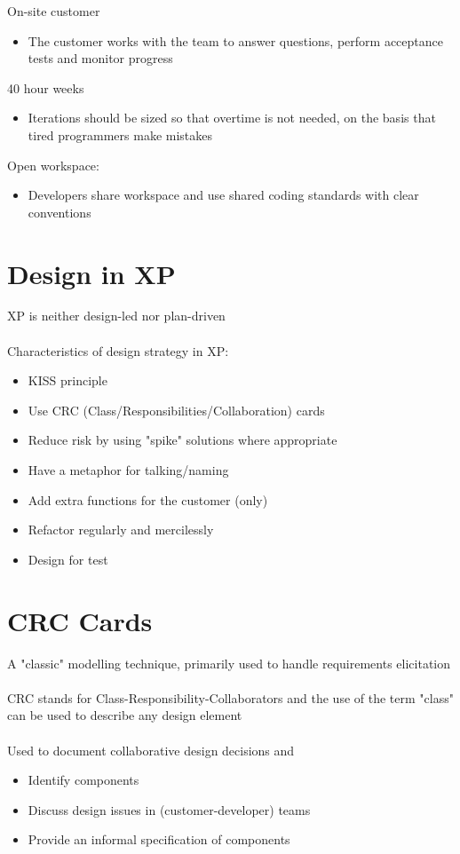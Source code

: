 \documentclass{article}[18pt]
\begin{document}
On-site customer
\begin{itemize}
	\item The customer works with the team to answer questions, perform acceptance tests and monitor progress
\end{itemize}
40 hour weeks
\begin{itemize}
	\item Iterations should be sized so that overtime is not needed, on the basis that tired programmers make mistakes
\end{itemize}
Open workspace:
\begin{itemize}
	\item Developers share workspace and use shared coding standards with clear conventions
\end{itemize}
\section{Design in XP}
XP is neither design-led nor plan-driven\\
\\
Characteristics of design strategy in XP:
\begin{itemize}
	\item KISS principle
	\item Use CRC (Class/Responsibilities/Collaboration) cards
	\item Reduce risk by using "spike" solutions where appropriate
	\item Have a metaphor for talking/naming
	\item Add extra functions for the customer (only)
	\item Refactor regularly and mercilessly
	\item Design for test
\end{itemize}
\section{CRC Cards}
A "classic" modelling technique, primarily used to handle requirements elicitation\\
\\
CRC stands for Class-Responsibility-Collaborators and the use of the term "class" can be used to describe any design element\\
\\
Used to document collaborative design decisions and
\begin{itemize}
	\item Identify components
	\item Discuss design issues in (customer-developer) teams
	\item Provide an informal specification of components
\end{itemize}
\end{document}

